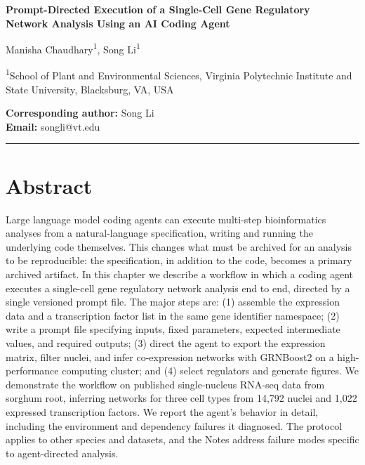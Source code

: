 \documentclass[11pt,a4paper]{article}
\begin{document}
\begin{singlespace}
\begin{flushleft}
\setlength{\parskip}{0pt}
{\Large\bfseries Prompt-Directed Execution of a Single-Cell Gene Regulatory\\ Network Analysis Using an AI Coding Agent\par}

\vspace{0.6em}

{\large Manisha Chaudhary\textsuperscript{1}, Song Li\textsuperscript{1}\par}

\vspace{0.4em}

\textsuperscript{1}School of Plant and Environmental Sciences, Virginia Polytechnic Institute and State University, Blacksburg, VA, USA

\vspace{0.4em}

\textbf{Corresponding author:} Song Li \\
\textbf{Email:} songli@vt.edu

\end{flushleft}
\end{singlespace}

\vspace{0.8em}
\hrule
\vspace{0.8em}

\section*{Abstract}

Large language model coding agents can execute multi-step bioinformatics analyses from a natural-language specification, writing and running the underlying code themselves. This changes what must be archived for an analysis to be reproducible: the specification, in addition to the code, becomes a primary archived artifact. In this chapter we describe a workflow in which a coding agent executes a single-cell gene regulatory network analysis end to end, directed by a single versioned prompt file. The major steps are: (1) assemble the expression data and a transcription factor list in the same gene identifier namespace; (2) write a prompt file specifying inputs, fixed parameters, expected intermediate values, and required outputs; (3) direct the agent to export the expression matrix, filter nuclei, and infer co-expression networks with GRNBoost2 on a high-performance computing cluster; and (4) select regulators and generate figures. We demonstrate the workflow on published single-nucleus RNA-seq data from sorghum root, inferring networks for three cell types from 14,792 nuclei and 1,022 expressed transcription factors. We report the agent's behavior in detail, including the environment and dependency failures it diagnosed. The protocol applies to other species and datasets, and the Notes address failure modes specific to agent-directed analysis.
\end{document}
